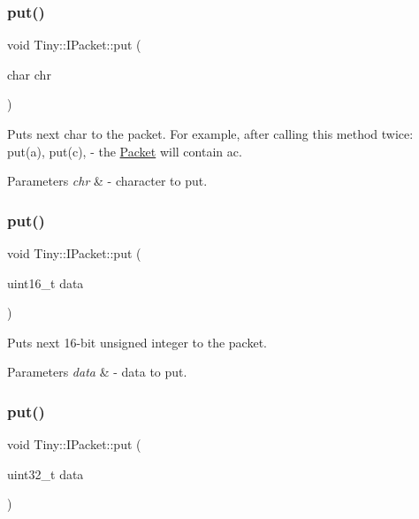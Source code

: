 \subsubsection{\texorpdfstring{put()}{put()}\hspace{0.1cm}{\footnotesize\ttfamily [2/7]}}
{\footnotesize\ttfamily void Tiny\+::\+I\+Packet\+::put (\begin{DoxyParamCaption}\item[{char}]{chr }\end{DoxyParamCaption})\hspace{0.3cm}{\ttfamily [inline]}}

Puts next char to the packet. For example, after calling this method twice\+: put(\textquotesingle{}a\textquotesingle{}), put(\textquotesingle{}c\textquotesingle{}), -\/ the \hyperlink{classTiny_1_1Packet}{Packet} will contain \textquotesingle{}ac\textquotesingle{}. 
\begin{DoxyParams}{Parameters}
{\em chr} & -\/ character to put. \\
\hline
\end{DoxyParams}
\mbox{\label{classTiny_1_1IPacket_a4dd6118251a5557691e4ed358a3b2ddc}} 
\subsubsection{\texorpdfstring{put()}{put()}\hspace{0.1cm}{\footnotesize\ttfamily [3/7]}}
{\footnotesize\ttfamily void Tiny\+::\+I\+Packet\+::put (\begin{DoxyParamCaption}\item[{uint16\+\_\+t}]{data }\end{DoxyParamCaption})\hspace{0.3cm}{\ttfamily [inline]}}

Puts next 16-\/bit unsigned integer to the packet. 
\begin{DoxyParams}{Parameters}
{\em data} & -\/ data to put. \\
\hline
\end{DoxyParams}
\mbox{\label{classTiny_1_1IPacket_a5ec37c88a536d710fb1561cd62f52c91}} 
\subsubsection{\texorpdfstring{put()}{put()}\hspace{0.1cm}{\footnotesize\ttfamily [4/7]}}
{\footnotesize\ttfamily void Tiny\+::\+I\+Packet\+::put (\begin{DoxyParamCaption}\item[{uint32\+\_\+t}]{data }\end{DoxyParamCaption})\hspace{0.3cm}{\ttfamily [inline]}}

